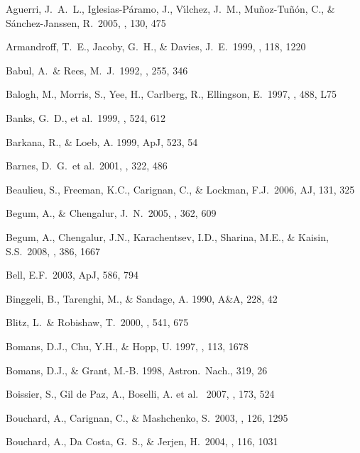 \documentclass[12pt,preprint]{emulateapj}
\begin{document}
\begin{thebibliography}{}

Aguerri, J.~A.~L., Iglesias-P{\'a}ramo, J., V{\'{\i}}lchez, J.~M., 
Mu{\~n}oz-Tu{\~n}{\'o}n, C., \& S{\'a}nchez-Janssen, R.\ 2005, \aj, 130, 475 

Armandroff, T.~E., Jacoby, G.~H., \& Davies, J.~E.\ 1999, \aj, 118, 1220

Babul, A.~\& Rees, M.~J.\ 1992, \mnras, 255, 346 

Balogh, M., Morris, S., Yee, H., Carlberg, R., Ellingson, E.\ 1997, \apj, 488, L75 

Banks, G.~D., et al.\ 1999, \apj, 524, 612 

Barkana, R., \& Loeb, A. 1999, ApJ, 523, 54

Barnes, D.~G.~et al.\ 2001, \mnras, 322, 486 

Beaulieu, S., Freeman, K.C., Carignan, C., \&  Lockman, F.J.\ 2006, AJ, 131, 325 

Begum, A., \& Chengalur, J.~N.\ 2005, \mnras, 362, 609 

Begum, A., Chengalur, J.N., Karachentsev, I.D., Sharina, M.E., \& Kaisin, S.S.\ 2008, \mnras, 386, 1667

Bell, E.F.\ 2003, ApJ, 586, 794

Binggeli, B., Tarenghi, M., \& Sandage, A. 1990, A\&A, 228, 42

Blitz, L.~\& Robishaw, T.\ 2000, \apj, 541, 675 

Bomans, D.J., Chu, Y.H., \& Hopp, U. 1997, \aj , 113, 1678

Bomans, D.J., \& Grant, M.-B. 1998, Astron.\ Nach., 319, 26

Boissier, S., Gil de Paz, A., Boselli, A. et al. \ 2007, \apj, 173, 524 

Bouchard, A., Carignan, C., \& Mashchenko, S.\ 2003, \aj, 126, 1295 

Bouchard, A., Da Costa, G.~S., \& Jerjen, H.\ 2004, \pasp, 116, 1031 


\end{thebibliography}
\end{document}
